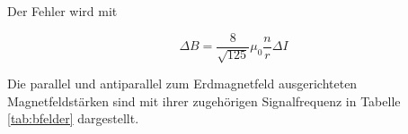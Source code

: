 Der Fehler wird mit

\begin{equation}
  \Delta{B} = \frac{8}{\sqrt{125}} \mu_0 \frac{n}{r} \Delta{I}
\end{equation}

Die parallel und antiparallel zum Erdmagnetfeld ausgerichteten Magnetfeldstärken
sind mit ihrer zugehörigen Signalfrequenz in Tabelle \ref{tab:bfelder} dargestellt.


